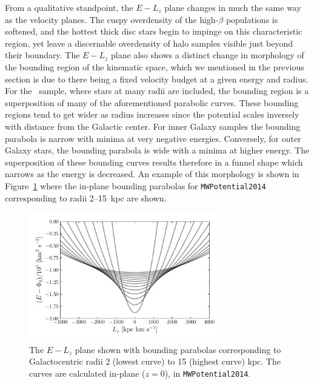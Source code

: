 From a qualitative standpoint, the $E-L_{z}$ plane changes in much the same way as the velocity planes. The cuspy overdensity of the high-$\beta$ populations is softened, and the hottest thick disc stars begin to impinge on this characteristic region, yet leave a discernable overdensity of halo samples visible just beyond their boundary. The $E-L_{z}$ plane also shows a distinct change in morphology of the bounding region of the kinematic space, which we mentioned in the previous section is due to there being a fixed velocity budget at a given energy and radius. For the \survey\ sample, where stars at many radii are included, the bounding region is a superposition of many of the aforementioned parabolic curves. These bounding regions tend to get wider as radius increases since the potential scales inversely with distance from the Galactic center. For inner Galaxy samples the bounding parabola is narrow with minima at very negative energies. Conversely, for outer Galaxy stars, the bounding parabola is wide with a minima at higher energy. The superposition of these bounding curves results therefore in a funnel shape which narrows as the energy is decreased. An example of this morphology is shown in Figure~\ref{ch2:fig:ELzBoundaries} where the in-plane bounding parabolas for \texttt{MWPotential2014} corresponding to radii 2--15~kpc are shown.

\begin{figure}
    \centering
    \includegraphics[width=0.75\textwidth]{figure/ch2/ELzBoundingParabolas.pdf}
    \caption{The $E-L_{z}$ plane shown with bounding parabolas corresponding to Galactocentric radii 2 (lowest curve) to 15 (highest curve) kpc. The curves are calculated in-plane ($z=0$), in \texttt{MWPotential2014}.}
    \label{ch2:fig:ELzBoundaries}
\end{figure}

